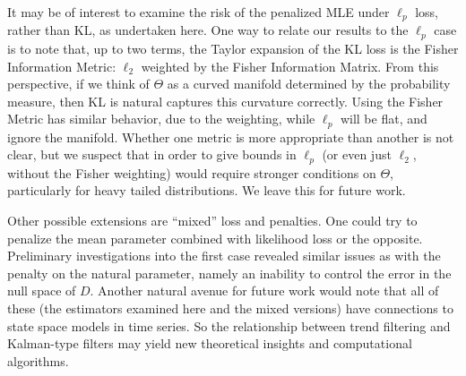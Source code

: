 \documentclass[ejs,noshowframe]{imsart}
\theoremstyle{plain}
\theoremstyle{definition}
\begin{document}
It may be of interest to examine the risk of the penalized MLE under $\ell_p$
loss, rather than KL, as undertaken here. One way to relate our results to the
$\ell_p$ case is to note that, up to two terms, the Taylor expansion of the KL
loss is the Fisher Information Metric: $\ell_2$ weighted by the Fisher
Information Matrix. From this perspective, if we think of $\Theta$ as a curved
manifold determined by the probability measure, then KL is natural captures this
curvature correctly. Using the Fisher Metric has similar behavior, due to the
weighting, while $\ell_p$ will be flat, and ignore the manifold. Whether one
metric is more appropriate than another is not clear, but we suspect that in
order to give bounds in $\ell_p$ (or even just $\ell_2$, without the Fisher
weighting) would require stronger conditions on $\Theta$, particularly for heavy
tailed distributions. We leave this for future work.

Other possible extensions are ``mixed'' loss and penalties. One could try to
penalize the mean parameter combined with likelihood loss or the opposite.
Preliminary investigations into the first case revealed similar issues as with
the penalty on the natural parameter, namely an inability to control the error
in the null space of $D$. Another natural avenue for future work would note that
all of these 
(the estimators examined here and the mixed versions) have connections to state
space models in 
time series. So the relationship between trend filtering and Kalman-type filters
may yield new theoretical insights and computational algorithms.
\end{document}
